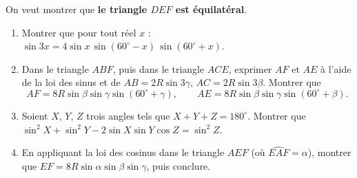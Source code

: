 On veut montrer que \textbf{le triangle $DEF$ est équilatéral}.
\begin{enumerate}
  \item Montrer que pour tout réel $x$ : $\sin3x=4\sin x\,\sin(60^\circ-x)\,\sin(60^\circ+x)$.
  \item Dans le triangle $ABF$, puis dans le triangle $ACE$, exprimer $AF$ et $AE$ à l'aide de la loi des sinus et de $AB=2R\sin3\gamma$, $AC=2R\sin3\beta$. Montrer que
  \[AF=8R\sin\beta\sin\gamma\sin(60^\circ+\gamma),\qquad AE=8R\sin\beta\sin\gamma\sin(60^\circ+\beta).\]
  \item Soient $X$, $Y$, $Z$ trois angles tels que $X+Y+Z=180^\circ$. Montrer que $\sin^2X+\sin^2Y-2\sin X\sin Y\cos Z=\sin^2Z$.
  \item En appliquant la loi des cosinus dans le triangle $AEF$ (où $\widehat{EAF}=\alpha$), montrer que $EF=8R\sin\alpha\sin\beta\sin\gamma$, puis conclure.
\end{enumerate}

